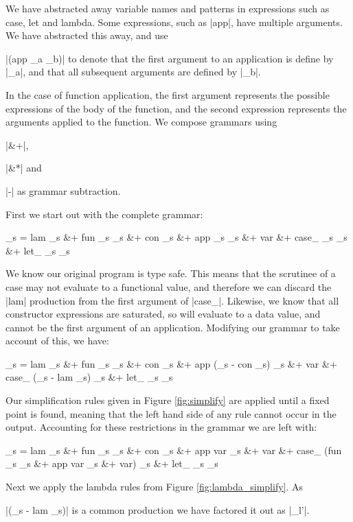 \documentclass[preprint]{sigplanconf}
\begin{document}
We have abstracted away variable names and patterns in expressions such as case, let and lambda. Some expressions, such as |app|, have multiple arguments. We have abstracted this away, and use \ignore|(app _a _b)| to denote that the first argument to an application is define by |_a|, and that all subsequent arguments are defined by |_b|.

In the case of function application, the first argument represents the possible expressions of the body of the function, and the second expression represents the arguments applied to the function. We compose grammars using \ignore|&+|, \ignore|&*| and \ignore|-| as grammar subtraction.

First we start out with the complete grammar:

\ignore\begin{code}
_s  =  lam _s &+ fun _s _s &+ con _s &+ app _s _s &+ var &+
       case_ _s _s &+ let_ _s _s
\end{code}

We know our original program is type safe. This means that the scrutinee of a case may not evaluate to a functional value, and therefore we can discard the |lam| production from the first argument of |case_|. Likewise, we know that all constructor expressions are saturated, so will evaluate to a data value, and cannot be the first argument of an application. Modifying our grammar to take account of this, we have:

\ignore\begin{code}
_s  =  lam _s &+ fun _s _s &+ con _s &+ app (_s - con _s) _s &+ var &+
       case_ (_s - lam _s) _s &+ let_ _s _s
\end{code}

Our simplification rules given in Figure \ref{fig:simplify} are applied until a fixed point is found, meaning that the left hand side of any rule cannot occur in the output. Accounting for these restrictions in the grammar we are left with:

\ignore\begin{code}
_s  =  lam _s &+ fun _s _s &+ con _s &+ app var _s &+ var &+
       case_ (fun _s _s &+ app var _s &+ var) _s &+ let_ _s _s
\end{code}

Next we apply the lambda rules from Figure \ref{fig:lambda_simplify}. As \ignore|(_s - lam _s)| is a common production we have factored it out as |_l'|.
\end{document}
